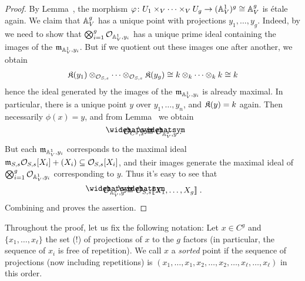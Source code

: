 \documentclass[a4paper,parskip=half,numbers=enddot, DIV=12]{scrreprt}
\begin{document}
\begin{proof}
	By Lemma~, the morphism $\phi\colon U_1\times_V\cdots\times_VU_g\morphism(\IA_V^1)^g\cong \IA_V^g$ is étale again. We claim that $\mathbb{A}_V^g$ has a unique point with projections $y_1,\ldots,y_g$. Indeed, by \cite[Proposition~1.3.2]{alggeo1} we need to show that $\bigotimes_{i=1}^g\mathcal{O}_{\mathbb{A}_V^1,y_i}$ has a unique prime ideal containing the images of the $\mathfrak{m}_{\mathbb{A}_V^1,y_i}$. But if we quotient out these images one after another, we obtain 
	\begin{align}\lbl{eq:manyks}
		\KK(y_1)\otimes_{\Oo_{S,s}}\cdots \otimes_{\Oo_{S,s}}\KK(y_g)\cong k\otimes_k\cdots\otimes_kk\cong k
	\end{align}
	hence the ideal generated by the images of the $\mathfrak{m}_{\mathbb{A}_V^1,y_i}$ is already maximal. In particular, there is a unique point $y$ over $y_1,\ldots,y_n$, and $\mathfrak{K}(y)=k$ again. Then necessarily $\phi(x)=y$, and from
	Lemma~ we obtain
	\begin{align}\lbl{eq:completion1}
		\roof{\Oo}_{C^g,x}\cong \roof{\Oo}_{\IA_V^g,y}\;.
	\end{align}
	But each $\mathfrak{m}_{\mathbb{A}_V^1,y_i}$ corresponds to the maximal ideal $\mathfrak{m}_{S,s}\mathcal{O}_{S,s}[X_i]+(X_i)\subseteq \mathcal{O}_{S,s}[X_i]$, and their images generate the maximal ideal of $\bigotimes_{i=1}^g\mathcal{O}_{\mathbb{A}_V^1,y_i}$ corresponding to $y$. Thus it's easy to see that
	\begin{align}\lbl{eq:completion2}
		\roof{\Oo}_{\IA_V^g,y}\cong \roof{\Oo}_{S,s}\llbracket X_1,\ldots,X_g\rrbracket\;.
	\end{align}
	Combining  and  proves the assertion.
\end{proof}
\begin{con}
	Throughout the proof, let us fix the following notation: Let $x\in C^g$ and $\{x_1,\ldots,x_\ell\}$ the set (!) of projections of $x$ to the $g$ factors (in particular, the sequence of $x_i$ is free of repetition). We call $x$ a \emph{sorted} point if the sequence of projections (now including repetitions) is $(x_1,\ldots,x_1,x_2,\ldots,x_2,\ldots,x_\ell,\ldots,x_\ell)$ in this order.
\end{con}
\end{document}
